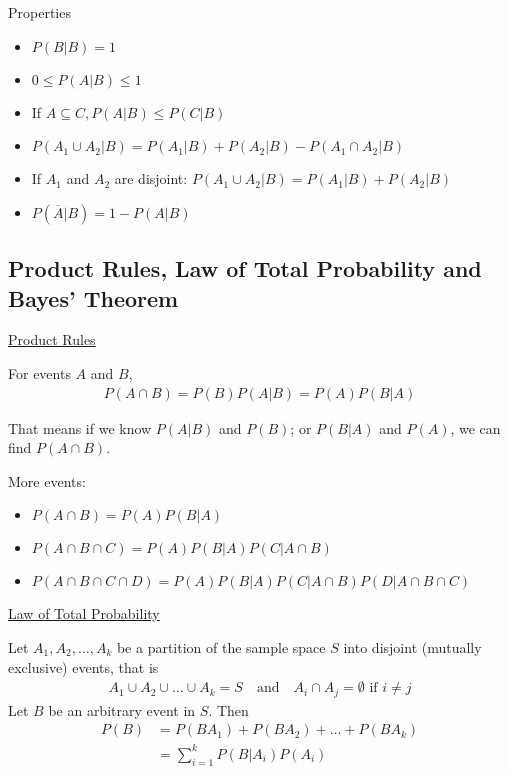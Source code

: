 \documentclass{article}
\begin{document}
Properties
\begin{itemize}
    \item $P(B|B) = 1$
    \item $0 \le P(A|B) \le 1$
    \item If $A \subseteq C, P(A|B) \le P(C|B)$
    \item $P(A_1 \cup A_2 | B) = P(A_1 | B) + P(A_2 | B) - P(A_1 \cap A_2 | B)$
    \item If $A_1$ and $A_2$ are disjoint: $P(A_1 \cup A_2 | B) = P(A_1|B) + P(A_2|B)$
    \item $P(\overline{A}|B) = 1 - P(A|B)$
\end{itemize}

\subsection{Product Rules, Law of Total Probability and Bayes' Theorem}

\underline{Product Rules}

For events $A$ and $B$, 
\begin{align*}
    P(A \cap B) = P(B)P(A|B) = P(A)P(B|A)
\end{align*}

That means if we know $P(A|B)$ and $P(B)$; or $P(B|A)$ and $P(A)$, we can find $P(A \cap B)$.

More events:
\begin{itemize}
    \item $P(A \cap B) = P(A)P(B|A)$
    \item $P(A \cap B \cap C) = P(A)P(B|A)P(C|A \cap B)$
    \item $P(A \cap B \cap C \cap D) = P(A)P(B|A)P(C|A \cap B)P(D | A \cap B \cap C)$
\end{itemize}

\underline{Law of Total Probability}

Let $A_1, A_2, \ldots, A_k$ be a partition of the sample space $S$ into disjoint (mutually exclusive) events, that is
\begin{align*}
    A_1 \cup A_2 \cup \ldots \cup A_k = S \quad \text{and} \quad A_i \cap A_j = \emptyset \text{ if } i \ne j
\end{align*}
Let $B$ be an arbitrary event in $S$. Then
\begin{align*}
    P(B) &= P(BA_1)+ P(BA_2) + \ldots + P(BA_k)\\
    &= \sum_{i=1}^k P(B|A_i)P(A_i)
\end{align*}
\end{document}
